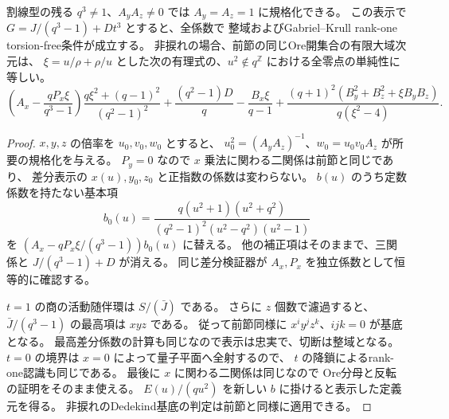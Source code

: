 \begin{proposition}\label{prop:cubic-CY-three-alpha-secant-difference}
割線型の残る $q^3\ne1$、$A_yA_z\ne0$ では
$A_y=A_z=1$ に規格化できる。
この表示で $G=J/(q^3-1)+Dt^3$ とすると、全係数で
整域およびGabriel--Krull rank-one torsion-free条件が成立する。
非捩れの場合、前節の同じOre開集合の有限大域次元は、
$\xi=u/\rho+\rho/u$ とした次の有理式の、$u^2\notin q^{\mathbb Z}$ における全零点の単純性に等しい。
\[
 \left(A_x-\frac{qP_x\xi}{q^3-1}\right)
        \frac{q\xi^2+(q-1)^2}{(q^2-1)^2}
 +\frac{(q^2-1)D}{q}-\frac{B_x\xi}{q-1}
 +\frac{(q+1)^2(B_y^2+B_z^2+\xi B_yB_z)}{q(\xi^2-4)}.
\]
\end{proposition}
\begin{proof}
$x,y,z$ の倍率を $u_0,v_0,w_0$ とすると、
$u_0^2=(A_yA_z)^{-1}$、$w_0=u_0 v_0 A_z$ が所要の規格化を与える。
$P_y=0$ なので $x$ 乗法に関わる二関係は前節と同じであり、
差分表示の $x(u),y_0,z_0$ と正指数の係数は変わらない。
$b(u)$ のうち定数係数を持たない基本項
\[
 b_0(u)=\frac{q(u^2+1)(u^2+q^2)}{(q^2-1)^2(u^2-q^2)(u^2-1)}
\]
を $(A_x-qP_x\xi/(q^3-1))b_0(u)$ に替える。
他の補正項はそのままで、三関係と $J/(q^3-1)+D$ が消える。
同じ差分検証器が $A_x,P_x$ を独立係数として恒等的に確認する。

$t=1$ の商の活動随伴環は $S/(\bar J)$ である。
さらに $z$ 個数で濾過すると、$\bar J/(q^3-1)$ の最高項は $xyz$ である。
従って前節同様に $x^iy^jz^k$、$ijk=0$ が基底となる。
最高差分係数の計算も同じなので表示は忠実で、切断は整域となる。
$t=0$ の境界は $x=0$ によって量子平面へ全射するので、
$t$ の降鎖によるrank-one認識も同じである。
最後に $x$ に関わる二関係は同じなので
Ore分母と反転の証明をそのまま使える。
$E(u)/(qu^2)$ を新しい $b$ に掛けると表示した定義元を得る。
非捩れのDedekind基底の判定は前節と同様に適用できる。
\end{proof}

